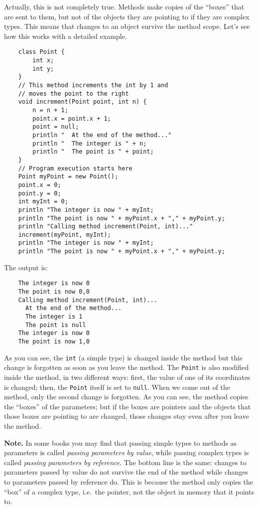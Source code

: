 Actually, this is not completely true. Methods make copies of the
``boxes'' that are sent to them, but not of the objects they are
pointing to if they are complex types. This means that changes to an
object survive the method scope. Let's see how this works with a
detailed example. 

\begin{verbatim}
    class Point {
        int x;
        int y;
    }
    // This method increments the int by 1 and 
    // moves the point to the right
    void increment(Point point, int n) {
        n = n + 1;
        point.x = point.x + 1;
        point = null;
        println "  At the end of the method..."
        println "  The integer is " + n;
        println "  The point is " + point;
    }
    // Program execution starts here
    Point myPoint = new Point();
    point.x = 0;
    point.y = 0;
    int myInt = 0;
    println "The integer is now " + myInt;
    println "The point is now " + myPoint.x + "," + myPoint.y;
    println "Calling method increment(Point, int)..."
    increment(myPoint, myInt);
    println "The integer is now " + myInt;
    println "The point is now " + myPoint.x + "," + myPoint.y;
\end{verbatim}

The output is: 

\begin{verbatim}
    The integer is now 0
    The point is now 0,0
    Calling method increment(Point, int)...
      At the end of the method...
      The integer is 1
      The point is null
    The integer is now 0
    The point is now 1,0
\end{verbatim}

As you can see, the \verb+int+ (a simple type) is changed inside the
method but this change is forgotten as soon as you leave the
method. The \verb+Point+ is also modified inside the method, 
in two different
ways: first, the value of one of its coordinates is changed; then, the
\verb+Point+ itself is set to \verb+null+. When we come out of the method,
only the second change is forgotten. As you can see, the method copies
the ``boxes'' of the parameters; but if the boxes are pointers and the
objects that those boxes are pointing to are changed, those changes stay
even after you leave the method. 

\textbf{Note.} In some books you may find that passing simple types to 
methods as parameters is called \emph{passing parameters by value}, while
passing complex types is called \emph{passing parameters by reference}. The
bottom line is the same: changes to parameters passed by value do not
survive the end of the method while changes to parameters passed by
reference do. This is because the method only copies the ``box'' of a
complex type, i.e.~the pointer, not the object in memory that it points to. 

